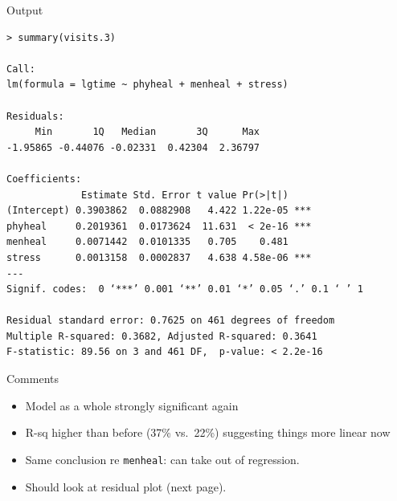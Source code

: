 \documentclass{beamer}
\begin{document}
\begin{frame}[fragile]{Output}
  
{\scriptsize
\begin{verbatim}
> summary(visits.3)

Call:
lm(formula = lgtime ~ phyheal + menheal + stress)

Residuals:
     Min       1Q   Median       3Q      Max 
-1.95865 -0.44076 -0.02331  0.42304  2.36797 

Coefficients:
             Estimate Std. Error t value Pr(>|t|)    
(Intercept) 0.3903862  0.0882908   4.422 1.22e-05 ***
phyheal     0.2019361  0.0173624  11.631  < 2e-16 ***
menheal     0.0071442  0.0101335   0.705    0.481    
stress      0.0013158  0.0002837   4.638 4.58e-06 ***
---
Signif. codes:  0 ‘***’ 0.001 ‘**’ 0.01 ‘*’ 0.05 ‘.’ 0.1 ‘ ’ 1 

Residual standard error: 0.7625 on 461 degrees of freedom
Multiple R-squared: 0.3682,	Adjusted R-squared: 0.3641 
F-statistic: 89.56 on 3 and 461 DF,  p-value: < 2.2e-16 

\end{verbatim}
}

\end{frame}

\begin{frame}[fragile]{Comments}

  \begin{itemize}
  \item Model as a whole strongly significant again 
  \item R-sq higher than before (37\% vs.\ 22\%) suggesting things more linear now
  \item Same conclusion re \verb-menheal-: can take out of regression.
  \item Should look at residual plot (next page).
  \end{itemize}
  
\end{frame}
\end{document}
